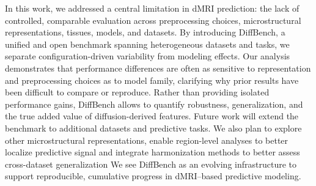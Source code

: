 

In this work, we addressed a central limitation in dMRI prediction: the lack of controlled, comparable evaluation across preprocessing choices, microstructural representations, tissues, models, and datasets.
By introducing DiffBench, a unified and open benchmark spanning heterogeneous datasets and tasks, we separate configuration-driven variability from modeling effects.
Our analysis demonstrates that performance differences are often as sensitive to representation and preprocessing choices as to model family, clarifying why prior results have been difficult to compare or reproduce.
Rather than providing isolated performance gains, DiffBench allows to quantify robustness, generalization, and the true added value of diffusion-derived features.
Future work will extend the benchmark to additional datasets and predictive tasks.
We also plan to explore other microstructural representations, enable region-level analyses to better localize predictive signal and integrate harmonization methods to better assess cross-dataset generalization
We see DiffBench as an evolving infrastructure to support reproducible, cumulative progress in dMRI–based predictive modeling.






